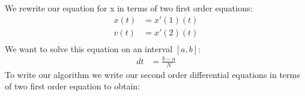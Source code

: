 \documentclass{article}
\begin{document}
We rewrite our equation for x in terms of two first order equations:
\begin{align*}
  x(t) &= x'(1)(t)\\
  v(t) &= x'(2)(t)\\
\end{align*}
We want to solve this equation on an interval $\left[a,b\right]$:
\begin{align*}
  dt &= \frac{b-a}{N}
\end{align*}
To write our algorithm we write our second order differential equations in terms of two first order equation to obtain:
\begin{align*}
  
\end{align*}
\end{document}
